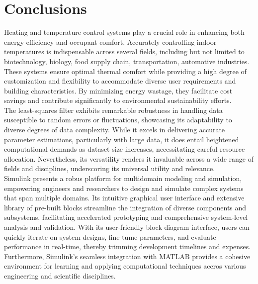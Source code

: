 \section{Conclusions}
Heating and temperature control systems play a crucial role in enhancing both energy efficiency and occupant comfort. Accurately controlling indoor temperatures is indispensable across several fields, including but not limited to biotechnology, biology, food supply chain, transportation, automotive industries. These systems ensure optimal thermal comfort while providing a high degree of customization and flexibility to accommodate diverse user requirements and building characteristics. By minimizing energy wastage, they facilitate cost savings and contribute significantly to environmental sustainability efforts. \\

The least-squares filter exhibits remarkable robustness in handling data susceptible to random errors or fluctuations, showcasing its adaptability to diverse degrees of data complexity. While it excels in delivering accurate parameter estimations, particularly with large data, it does entail heightened computational demands as dataset size increases, necessitating careful resource allocation. Nevertheless, its versatility renders it invaluable across a wide range of fields and disciplines, underscoring its universal utility and relevance. \\

Simulink presents a robus platform for multidomain modeling and simulation, empowering engineers and researchers to design and simulate complex systems that span multiple domains. Its intuitive  graphical user interface and extensive library of pre-built blocks streamline the integration of diverse components and subsystems, facilitating accelerated prototyping and comprehensive system-level analysis and validation. With its user-friendly block diagram interface, users can quickly iterate on system designs, fine-tume parameters, and evaluate performance in real-time, thereby trimming development timelines and expenses. Furthermore, Simulink's seamless integration with MATLAB provides a cohesive environment for learning and applying computational techniques accros various engineering and scientific disciplines.
